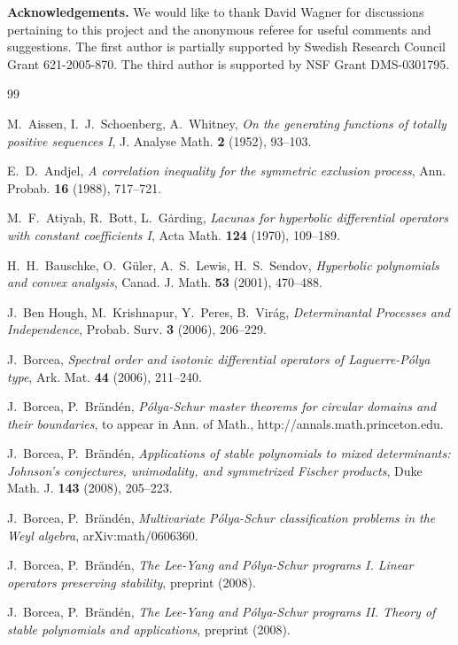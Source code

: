 \documentclass[10pt,reqno]{amsart}
\theoremstyle{plain}
\theoremstyle{definition}
\theoremstyle{remark}
\begin{document}
\medskip

\noindent
{\bf Acknowledgements.} We would like to thank David Wagner for 
discussions pertaining to this project and the anonymous referee for useful 
comments and suggestions. The first author is 
partially supported by Swedish Research 
Council Grant 621-2005-870. The third author is supported by 
NSF Grant DMS-0301795.

\begin{thebibliography}{99}

M.~Aissen, I.~J.~Schoenberg, A.~Whitney, {\em On the generating functions of 
totally positive sequences I}, J. Analyse Math. {\bf 2} (1952), 93--103.

E.~D.~Andjel, {\em A correlation inequality for the symmetric exclusion 
process}, Ann. Probab. {\bf 16} (1988), 717--721.

M.~F.~Atiyah, R.~Bott, L.~G\.arding, {\em Lacunas for
hyperbolic differential operators with constant coefficients I},
Acta Math. {\bf 124} (1970), 109--189.

H.~H.~Bauschke, O.~G\"uler, A.~S.~Lewis, H.~S.~Sendov, {\em Hyperbolic 
polynomials and convex analysis}, Canad. J. Math. {\bf 53} (2001), 470--488.

J.~Ben Hough, M.~Krishnapur, Y.~Peres, B.~Vir\'ag, {\em Determinantal
Processes and Independence}, Probab. Surv. {\bf 3} (2006), 206--229.

J.~Borcea, {\em Spectral order and isotonic differential operators of
Laguerre-P\'olya  type},  Ark. Mat. {\bf 44} (2006), 211--240.

J.~Borcea, P.~Br\"and\'en, {\em P\'olya-Schur master theorems for 
circular domains and their boundaries}, to appear in Ann. of Math., 
http://annals.math.princeton.edu.

J.~Borcea, P.~Br\"and\'en, {\em Applications of stable 
polynomials to mixed determinants: Johnson's conjectures, unimodality, and 
symmetrized Fischer products}, Duke Math. J. {\bf 143} (2008), 205--223.

J.~Borcea, P.~Br\"and\'en, {\em Multivariate P\'olya-Schur classification problems in 
the Weyl algebra}, arXiv:math/0606360.

J.~Borcea, P.~Br\"and\'en, {\em The Lee-Yang and P\'olya-Schur programs I. 
Linear operators preserving stability}, preprint (2008).

J.~Borcea, P.~Br\"and\'en, {\em The Lee-Yang and P\'olya-Schur programs II. 
Theory of stable polynomials and applications}, preprint (2008).


\end{thebibliography}
\end{document}
